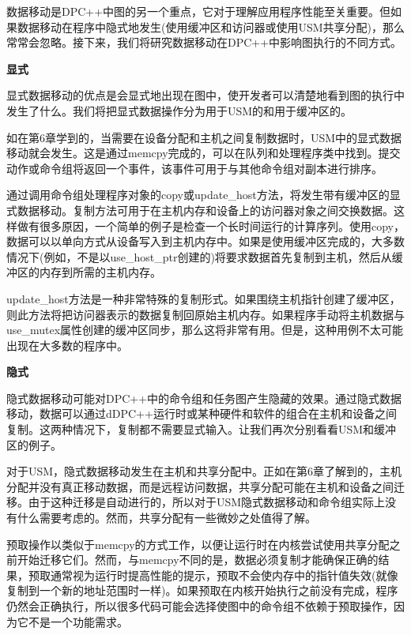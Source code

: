 数据移动是DPC++中图的另一个重点，它对于理解应用程序性能至关重要。但如果数据移动在程序中隐式地发生(使用缓冲区和访问器或使用USM共享分配)，那么常常会忽略。接下来，我们将研究数据移动在DPC++中影响图执行的不同方式。\par

\hspace*{\fill} \par %
\textbf{显式}

显式数据移动的优点是会显式地出现在图中，使开发者可以清楚地看到图的执行中发生了什么。我们将把显式数据操作分为用于USM的和用于缓冲区的。\par

如在第6章学到的，当需要在设备分配和主机之间复制数据时，USM中的显式数据移动就会发生。这是通过memcpy完成的，可以在队列和处理程序类中找到。提交动作或命令组将返回一个事件，该事件可用于与其他命令组对副本进行排序。\par

通过调用命令组处理程序对象的copy或update\_host方法，将发生带有缓冲区的显式数据移动。复制方法可用于在主机内存和设备上的访问器对象之间交换数据。这样做有很多原因，一个简单的例子是检查一个长时间运行的计算序列。使用copy，数据可以以单向方式从设备写入到主机内存中。如果是使用缓冲区完成的，大多数情况下(例如，不是以use\_host\_ptr创建的)将要求数据首先复制到主机，然后从缓冲区的内存到所需的主机内存。\par

update\_host方法是一种非常特殊的复制形式。如果围绕主机指针创建了缓冲区，则此方法将把访问器表示的数据复制回原始主机内存。如果程序手动将主机数据与use\_mutex属性创建的缓冲区同步，那么这将非常有用。但是，这种用例不太可能出现在大多数的程序中。\par

\hspace*{\fill} \par %
\textbf{隐式}

隐式数据移动可能对DPC++中的命令组和任务图产生隐藏的效果。通过隐式数据移动，数据可以通过dDPC++运行时或某种硬件和软件的组合在主机和设备之间复制。这两种情况下，复制都不需要显式输入。让我们再次分别看看USM和缓冲区的例子。\par

对于USM，隐式数据移动发生在主机和共享分配中。正如在第6章了解到的，主机分配并没有真正移动数据，而是远程访问数据，共享分配可能在主机和设备之间迁移。由于这种迁移是自动进行的，所以对于USM隐式数据移动和命令组实际上没有什么需要考虑的。然而，共享分配有一些微妙之处值得了解。\par

预取操作以类似于memcpy的方式工作，以便让运行时在内核尝试使用共享分配之前开始迁移它们。然而，与memcpy不同的是，数据必须复制才能确保正确的结果，预取通常视为运行时提高性能的提示，预取不会使内存中的指针值失效(就像复制到一个新的地址范围时一样)。如果预取在内核开始执行之前没有完成，程序仍然会正确执行，所以很多代码可能会选择使图中的命令组不依赖于预取操作，因为它不是一个功能需求。\par

